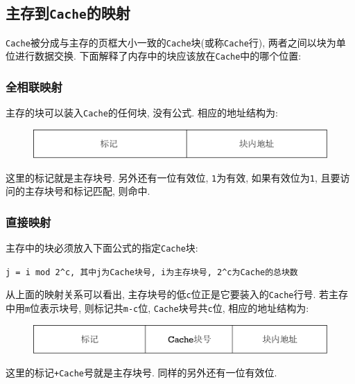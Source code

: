\subsection{主存到\texttt{Cache}的映射}
\verb|Cache|被分成与主存的页框大小一致的\verb|Cache|块(或称\verb|Cache|行), 两者之间以块为单位进行数据交换. 下面解释了内存中的块应该放在\verb|Cache|中的哪个位置:
\subsubsection{全相联映射}
主存的块可以装入\verb|Cache|的任何块, 没有公式. 相应的地址结构为:
\begin{figure}[H]
\centering
\includegraphics[scale=.5]{img/figure13.pdf}
\end{figure}\par
这里的标记就是主存块号. 另外还有一位有效位, \verb|1|为有效, 如果有效位为\verb|1|, 且要访问的主存块号和标记匹配, 则命中.
\subsubsection{直接映射}
主存中的块必须放入下面公式的指定\verb|Cache|块:
\begin{center}
\verb|j = i mod 2^c, 其中j为Cache块号, i为主存块号, 2^c为Cache的总块数|
\end{center} \par
\par 从上面的映射关系可以看出, 主存块号的低\verb|c|位正是它要装入的\verb|Cache|行号. 若主存中用\verb|m|位表示块号, 则标记共\verb|m-c|位, \verb|Cache|块号共\verb|c|位, 相应的地址结构为:
\begin{figure}[H]
\centering
\includegraphics[scale=.5]{img/figure15.pdf}
\end{figure}\par
这里的标记\verb|+Cache|号就是主存块号. 同样的另外还有一位有效位.
